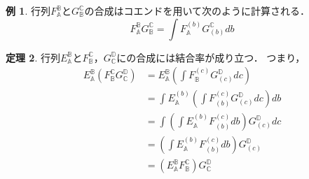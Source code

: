 \documentclass[a4j,12pt]{jarticle}
\theoremstyle{definition}
\newtheorem{theorem}{定理}[section]
\newtheorem{example}[theorem]{例}
\numberwithin{equation}{section}
\newcommand{\CC}{\mathbb{C}}
\renewcommand{\AA}{\mathbb{A}}
\newcommand{\BB}{\mathbb{B}}
\newcommand{\DD}{\mathbb{D}}
\newcommand{\1}{\mathbb{1}}
\newcommand{\2}{\mathbb{2}}
\renewcommand{\.}{\hspace{2mm}}
\begin{document}
\begin{example}
  行列$F^\BB_\AA$と$G^\CC_\BB$の合成はコエンドを用いて次のように計算される．
  \[
    F^\BB_\AA G^\CC_\BB = \int F^{(b)}_\AA G^\CC_{(b)}db
  \]
\end{example}
\begin{theorem}
  行列$E_\AA^\BB$と$F_\BB^\CC$，$G_\CC^\DD$にの合成には結合率が成り立つ．
  つまり，
  \begin{align*}
    E_\AA^\BB (F_\BB^\CC G_\CC^\DD) &= E_\AA^\BB \left(\int F_\BB^{(c)} G_{(c)}^\DD dc\right) \\
    &= \int E_\AA^{(b)} \left(\int F_{(b)}^{(c)} G_{(c)}^\DD dc\right) db \\
    &= \int \left(\int E_\AA^{(b)} F_{(b)}^{(c)} db \right) G_{(c)}^\DD dc \\
    &= \left(\int E_\AA^{(b)} F_{(b)}^{(c)} db \right) G_{(c)}^\DD \\
    &= (E_\AA^\BB F_\BB^\CC) G_\CC^\DD
  \end{align*}
\end{theorem}
\end{document}
